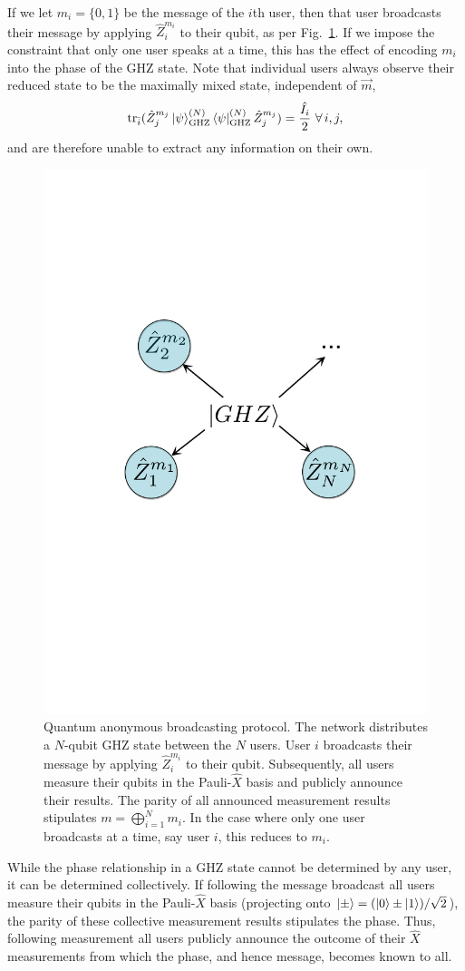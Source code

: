 If we let $m_i=\{0,1\}$ be the message of the $i$th user, then that user broadcasts their message by applying $\hat{Z}_i^{m_i}$ to their qubit, as per Fig.~\ref{fig:QAB}. If we impose the constraint that only one user speaks at a time, this has the effect of encoding $m_i$ into the phase of the GHZ state. Note that individual users always observe their reduced state to be the maximally mixed state, independent of $\vec m$,
\begin{align}
	\mathrm{tr}_{\bar i}(\hat{Z}_{j}^{m_j} \ket\psi_\mathrm{GHZ}^{(N)}\bra\psi_\mathrm{GHZ}^{(N)}\hat{Z}_{j}^{m_j}) = \frac{\hat{I_i}}{2}\,\,\forall\, i,j,
\end{align}
and are therefore unable to extract any information on their own.

\begin{figure}[!htb]
\includegraphics[width=0.6\columnwidth]{figures/QAB}
\caption{Quantum anonymous broadcasting protocol. The network distributes a $N$-qubit GHZ state between the $N$ users. User $i$ broadcasts their message by applying $\hat{Z}_i^{m_i}$ to their qubit. Subsequently, all users measure their qubits in the Pauli-$\hat{X}$ basis and publicly announce their results. The parity of all announced measurement results stipulates \mbox{$m=\bigoplus_{i=1}^N m_i$}. In the case where only one user broadcasts at a time, say user $i$, this reduces to $m_i$.} \label{fig:QAB}
\end{figure}

While the phase relationship in a GHZ state cannot be determined by any user, it can be determined collectively. If following the message broadcast all users measure their qubits in the Pauli-$\hat{X}$ basis (projecting onto \mbox{$\ket\pm = (\ket{0}\pm\ket{1})/\sqrt{2}$}), the parity of these collective measurement results stipulates the phase. Thus, following measurement all users publicly announce the outcome of their $\hat{X}$ measurements from which the phase, and hence message, becomes known to all.

